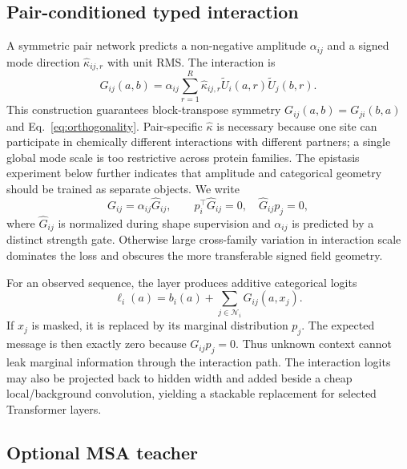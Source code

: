 \documentclass[10pt]{article}
\begin{document}
\subsection{Pair-conditioned typed interaction}

A symmetric pair network predicts a non-negative amplitude $\alpha_{ij}$ and a signed mode
direction $\widehat\kappa_{ij,r}$ with unit RMS.  The interaction is
\begin{equation}
G_{ij}(a,b)
=\alpha_{ij}\sum_{r=1}^{R}\widehat\kappa_{ij,r}
\widetilde U_i(a,r)\widetilde U_j(b,r).
\label{eq:factorization}
\end{equation}
This construction guarantees block-transpose symmetry
$G_{ij}(a,b)=G_{ji}(b,a)$ and Eq.~\ref{eq:orthogonality}.  Pair-specific $\widehat\kappa$
is necessary because one site can participate in chemically different interactions with
different partners; a single global mode scale is too restrictive across protein families.
The epistasis experiment below further indicates that amplitude and categorical geometry
should be trained as separate objects.  We write
\begin{equation}
G_{ij}=\alpha_{ij}\widehat G_{ij},\qquad
p_i^\top\widehat G_{ij}=0,\quad \widehat G_{ij}p_j=0,
\label{eq:amplitude-shape}
\end{equation}
where $\widehat G_{ij}$ is normalized during shape supervision and $\alpha_{ij}$ is predicted by
a distinct strength gate.  Otherwise large cross-family variation in interaction scale dominates
the loss and obscures the more transferable signed field geometry.

For an observed sequence, the layer produces additive categorical logits
\begin{equation}
\ell_i(a)=b_i(a)+\sum_{j\in\mathcal N_i}G_{ij}(a,x_j).
\label{eq:additive-logits}
\end{equation}
If $x_j$ is masked, it is replaced by its marginal distribution $p_j$.  The expected message is
then exactly zero because $G_{ij}p_j=0$.  Thus unknown context cannot leak marginal information
through the interaction path.  The interaction logits may also be projected back to hidden
width and added beside a cheap local/background convolution, yielding a stackable replacement
for selected Transformer layers.

\subsection{Optional MSA teacher}
\end{document}
